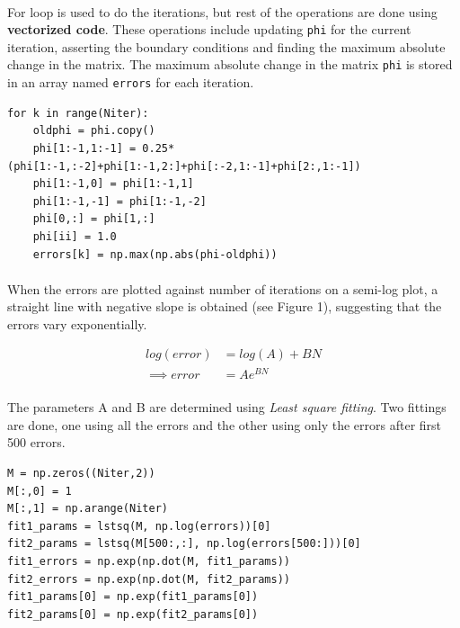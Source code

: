 \documentclass[12pt, a4paper]{article}
\begin{document}
\paragraph*{}
For loop is used to do the iterations, but rest of the operations are done using \textbf{vectorized code}. These operations include updating \texttt{phi} for the current iteration, asserting the boundary conditions and finding the maximum absolute change in the matrix. The maximum absolute change in the matrix \texttt{phi} is stored in an array named \texttt{errors} for each iteration.

\begin{lstlisting}
for k in range(Niter):
    oldphi = phi.copy()
    phi[1:-1,1:-1] = 0.25*(phi[1:-1,:-2]+phi[1:-1,2:]+phi[:-2,1:-1]+phi[2:,1:-1])
    phi[1:-1,0] = phi[1:-1,1]
    phi[1:-1,-1] = phi[1:-1,-2]
    phi[0,:] = phi[1,:]
    phi[ii] = 1.0
    errors[k] = np.max(np.abs(phi-oldphi))
\end{lstlisting}

\paragraph*{}
When the errors are plotted against number of iterations on a semi-log plot, a straight line with negative slope is obtained (see Figure 1), suggesting that the errors vary exponentially. 

\begin{align*}
log(error) &= log(A) + BN \\
\implies error &= Ae^{BN}
\end{align*}

\paragraph*{}
The parameters A and B are determined using \textit{Least square fitting}. Two fittings are done, one using all the errors and the other using only the errors after first 500 errors.

\begin{lstlisting}
M = np.zeros((Niter,2))
M[:,0] = 1
M[:,1] = np.arange(Niter)
fit1_params = lstsq(M, np.log(errors))[0]
fit2_params = lstsq(M[500:,:], np.log(errors[500:]))[0]
fit1_errors = np.exp(np.dot(M, fit1_params))
fit2_errors = np.exp(np.dot(M, fit2_params))
fit1_params[0] = np.exp(fit1_params[0])
fit2_params[0] = np.exp(fit2_params[0])
\end{lstlisting}
\end{document}

